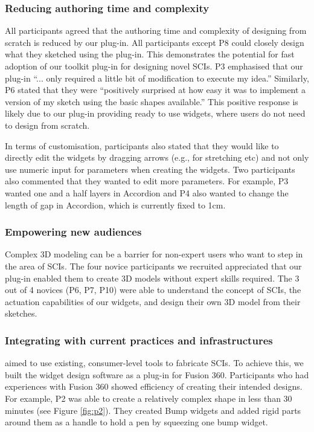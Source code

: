       \subsubsection{Reducing authoring time and complexity}
        All participants agreed that the authoring time and complexity of
        designing from scratch is reduced by our plug-in. All participants
        except P8 could closely design what they sketched using the plug-in.
        This demonstrates the potential for fast adoption of our toolkit plug-in
        for designing novel SCIs.  P3 emphasised that our plug-in ``... only
        required a little bit of modification to execute my idea.'' Similarly,
        P6 stated that they were ``positively surprised at how easy it was to
        implement a version of my sketch using the basic shapes available.''
        This positive response is likely due to our plug-in providing ready to
        use widgets, where users do not need to design from scratch.

        In terms of customisation, participants also stated that they would like
        to directly edit the widgets by dragging arrows (e.g., for stretching
        etc) and not only use numeric input for parameters when creating the
        widgets. Two participants also commented that they wanted to edit more
        parameters. For example, P3 wanted one and a half layers in Accordion
        and P4 also wanted to change the length of gap in Accordion, which is
        currently fixed to 1cm.         

        \subsubsection{Empowering new audiences}
          Complex 3D modeling can be a barrier for non-expert users who want to
          step in the area of SCIs. The four novice participants we recruited
          appreciated that our plug-in enabled them to create 3D models without
          expert skills required. The 3 out of 4 novices (P6, P7, P10) were able
          to understand the concept of SCIs, the actuation capabilities of our
          widgets, and design their own 3D model from their sketches.
          
        \subsubsection{Integrating with current practices and infrastructures}
          \mp aimed to use existing, consumer-level tools  to fabricate SCIs.
          To achieve this, we built the widget design software as a plug-in for
          Fusion 360.  Participants who had experiences with Fusion 360 showed
          efficiency of creating their intended designs. For example, P2 was
          able to create a relatively complex shape in less than 30 minutes (see
          Figure \ref{fig:p2}). They created Bump widgets and added rigid parts
          around them as a handle to hold a pen by squeezing one bump widget. 
          
